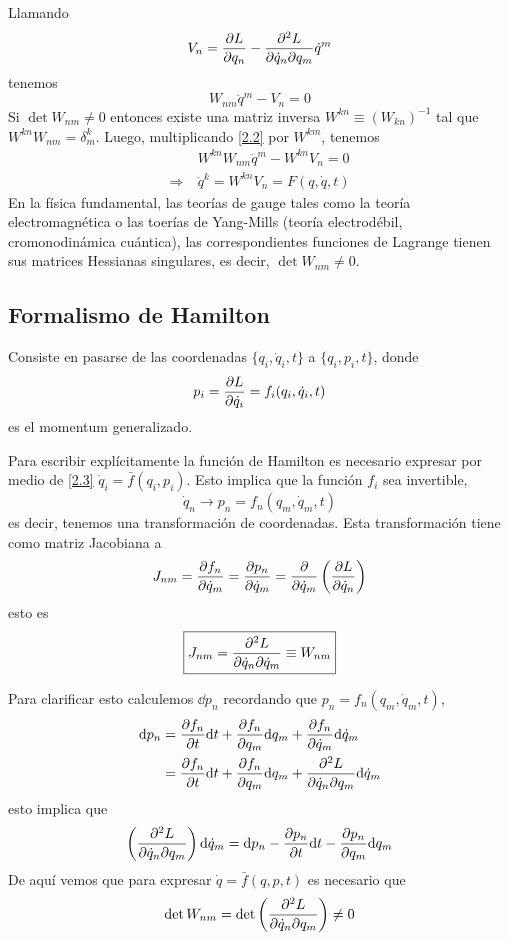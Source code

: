 Llamando 
\begin{equation}
V_n=\pdv{L}{q_n}-\pdv{L}{\dot{q}_n}{q_m}{\dot{q}^m}
\end{equation}
tenemos
\begin{equation}\label{2.2}
  W_{nm}\ddot{q}^{m}-V_n=0
\end{equation}
Si $\det W_{nm}\neq 0$ entonces existe una matriz inversa $W^{kn}\equiv (W_{kn})^{-1}$ tal que $W^{kn}W_{nm}=\delta ^k_m$. Luego, multiplicando \eqref{2.2} por $W^{km}$, tenemos
\begin{align}
 & W^{kn}W_{nm}\ddot{q}^m-W^{kn}V_n=0\\
  \Rightarrow \ & \ddot{q}^k=W^{kn}V_n=F(q,\dot{q},t)
\end{align}
En la física fundamental, las teorías de gauge tales como la teoría electromagnética o las toerías de Yang-Mills (teoría electrodébil, cromonodinámica cuántica), las correspondientes funciones de Lagrange tienen sus matrices Hessianas singulares, es decir, $\det W_{nm}\neq 0$.

\subsection{Formalismo de Hamilton}
Consiste en pasarse de las coordenadas $\{q_i,\dot{q}_i,t\}$ a $\{q_i,p_i,t\}$, donde
\begin{equation}\label{2.3}
  p_i=\pdv{L}{\dot{q}_i}=f_i(q_i,\dot{q}_i,t)
\end{equation}
es el momentum generalizado.

Para escribir explícitamente la función de Hamilton es necesario expresar por medio de \eqref{2.3} $\dot{q}_i=\bar{f}(q_i,p_i)$. Esto implica que la función $f_i$ sea invertible,
\begin{equation}
  \dot{q}_n\to p_n=f_n(q_m,\dot{q}_m,t)
\end{equation}
es decir, tenemos una transformación de coordenadas. Esta transformación tiene como matriz Jacobiana a 
\begin{equation}
  J_{nm}=\pdv{f_n}{\dot{q}_m}=\pdv{p_n}{\dot{q}_m}=\pdv{\dot{q}_m}\left(\pdv{L}{\dot{q}_n}\right)
\end{equation}
esto es
\begin{equation}
  \boxed{J_{nm}=\pdv{L}{\dot{q}_n}{\dot{q}_m}\equiv W_{nm}}
\end{equation}

Para clarificar esto calculemos $\dd p_n$ recordando que $p_n=f_n(q_m,\dot{q}_m,t)$,
\begin{align}
  \dd p_n&=\pdv{f_n}{t}\dd t+\pdv{f_n}{q_m}\dd q_m+\pdv{f_n}{\dot{q}_m}\dd \dot{q}_m\\
  &=\pdv{f_n}{t}\dd t+\pdv{f_n}{q_m}\dd q_m+\pdv{L}{\dot{q}_n}{q_m}\dd \dot{q}_m
\end{align}
esto implica que
\begin{equation}
  \left(\pdv{L}{\dot{q}_n}{q_m}\right)\dd \dot{q}_m=\dd p_n-\pdv{p_n}{t}\dd t-\pdv{p_n}{q_m}\dd q_m
\end{equation}
De aquí vemos que para expresar $\dot{q}=\bar{f}(q,p,t)$ es necesario que
\begin{equation}
  \det W_{nm}=\det \left(\pdv{L}{\dot{q}_n}{q_m}\right)\neq 0
\end{equation}


